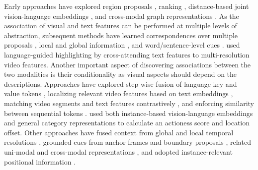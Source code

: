 


Early approaches have explored region proposals \citep{chen2018temporally,qu2020fine,liu2018cross}, ranking \citep{escorcia2019temporal}, distance-based joint vision-language embeddings \citep{anne2017localizing,rohrbach2016grounding}, and cross-modal graph representations \citep{liu2022memory,zhang2019man}. As
the association of visual and text features can be performed at multiple levels of abstraction, subsequent methods have learned correspondences over multiple proposals \citep{xu2019multilevel}, local and global information \citep{jiang2019cross,mun2020local}, and word/sentence-level cues \citep{hao2022query}. \citet{zhang2021natural} used language-guided highlighting by cross-attending text features to multi-resolution video features. Another important aspect of discovering associations between the two modalities is their conditionality as visual aspects should depend on the descriptions. Approaches have explored step-wise fusion of language key and value tokens 
\citep{cao2021pursuit}, localizing relevant video features based on text embeddings \citep{yang2022tubedetr}, matching video segments and text features contrastively \citep{flanagan2023learning}, and enforcing similarity between sequential tokens \citep{qian2024momentor}. \citet{ge2019mac} used both instance-based vision-language embeddings and general category representations to calculate an actioness score and location offset. Other approaches have fused context from global and local temporal resolutions \citep{liu2021context}, grounded cues from anchor frames and boundary proposals \citep{wang2020temporally}, related uni-modal and cross-modal representations \citep{nan2021interventional}, and adopted instance-relevant positional information \citep{gu2024context}.



